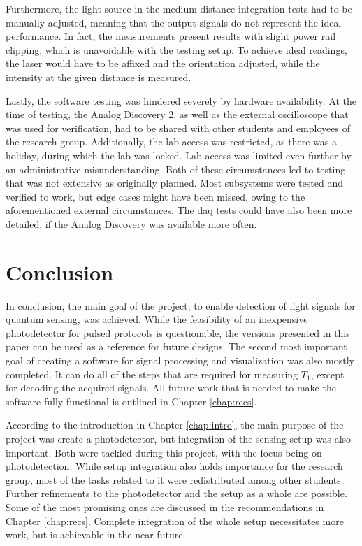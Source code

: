 Furthermore, the light source in the medium-distance integration tests had to be manually adjusted, meaning that the output signals do not represent the ideal performance. In fact, the measurements present results with slight power rail clipping, which is unavoidable with the testing setup. To achieve ideal readings, the laser would have to be affixed and the orientation adjusted, while the intensity at the given distance is measured.

Lastly, the software testing was hindered severely by hardware availability. At the time of testing, the Analog Discovery 2, as well as the external oscilloscope that was used for verification, had to be shared with other students and employees of the research group. Additionally, the lab access was restricted, as there was a holiday, during which the lab was locked. Lab access was limited even further by an administrative misunderstanding. Both of these circumstances led to testing that was not extensive as originally planned. Most subsystems were tested and verified to work, but edge cases might have been missed, owing to the aforementioned external circumstances. The \gls{daq} tests could have also been more detailed, if the Analog Discovery was available more often.


\chapter{Conclusion}
In conclusion, the main goal of the project, to enable detection of light signals for quantum sensing, was achieved. While the feasibility of an inexpensive photodetector for pulsed protocols is questionable, the versions presented in this paper can be used as a reference for future designs. The second most important goal of creating a software for signal processing and visualization was also mostly completed. It can do all of the steps that are required for measuring $T_1$, except for decoding the acquired signals. All future work that is needed to make the software fully-functional is outlined in Chapter \ref{chap:recs}.

According to the introduction in Chapter \ref{chap:intro}, the main purpose of the project was create a photodetector, but integration of the sensing setup was also important. Both were tackled during this project, with the focus being on photodetection. While setup integration also holds importance for the research group, most of the tasks related to it were redistributed among other students. Further refinements to the photodetector and the setup as a whole are possible. Some of the most promising ones are discussed in the recommendations in Chapter \ref{chap:recs}. Complete integration of the whole setup necessitates more work, but is achievable in the near future.

